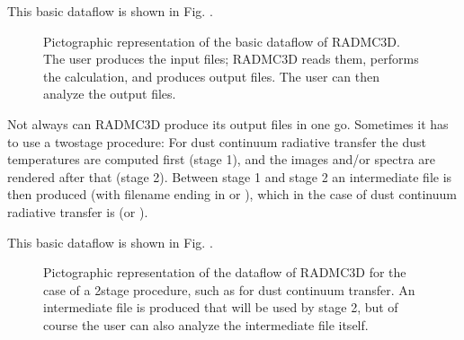 \documentclass[letterpaper,10pt,english]{sphinxmanual}
\begin{document}
This basic dataflow is shown in Fig. {\hyperref[\detokenize{basicstructure:fig-dataflow-basic}]{}}.

\begin{figure}[htbp]
\centering
\capstart

\noindent{}
\caption{Pictographic representation of the basic dataflow of RADMC\sphinxhyphen{}3D. The user
produces the input files; RADMC\sphinxhyphen{}3D reads them, performs the calculation,
and produces output files. The user can then analyze the output files.}\label{\detokenize{basicstructure:id1}}\label{\detokenize{basicstructure:fig-dataflow-basic}}\end{figure}

Not always can RADMC\sphinxhyphen{}3D produce its output files in one go. Sometimes it has to
use a two\sphinxhyphen{}stage procedure: For dust continuum radiative transfer the dust
temperatures are computed first (stage 1), and the images and/or spectra are
rendered after that (stage 2). Between stage 1 and stage 2 an intermediate file
is then produced (with filename ending in  or ),
which in the case of dust continuum radiative transfer is 
(or ).

This basic dataflow is shown in Fig. {\hyperref[\detokenize{basicstructure:fig-dataflow-twostage}]{}}.

\begin{figure}[htbp]
\centering
\capstart

\noindent{}
\caption{Pictographic representation of the dataflow of RADMC\sphinxhyphen{}3D for the case
of a 2\sphinxhyphen{}stage procedure, such as for dust continuum transfer. An intermediate
file is produced that will be used by stage 2, but of course the user can
also analyze the intermediate file itself.}\label{\detokenize{basicstructure:id2}}\label{\detokenize{basicstructure:fig-dataflow-twostage}}\end{figure}
\end{document}
